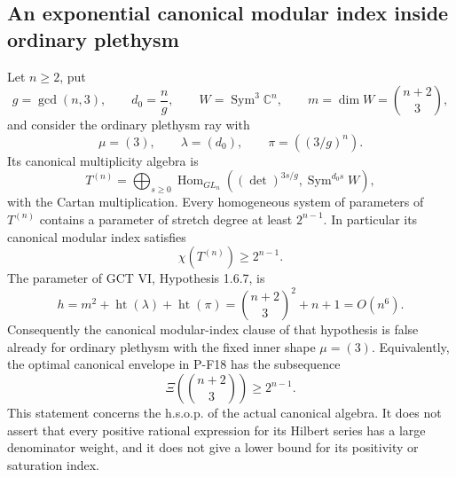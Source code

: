 \subsection{An exponential canonical modular index inside ordinary plethysm}

\begin{proposition}
\label{prop:cubiccanonicalcounterexample}
Let $n\ge2$, put
\[
 g=\gcd(n,3),\qquad d_0=\frac ng,\qquad
 W=\operatorname{Sym}^3\mathbb C^n,\qquad
 m=\dim W=\binom{n+2}{3},
\]
and consider the ordinary plethysm ray with
\[
 \mu=(3),\qquad \lambda=(d_0),\qquad
 \pi=((3/g)^n).
 \tag{P-F19a}
\]
Its canonical multiplicity algebra is
\[
 T^{(n)}=\bigoplus_{s\ge0}
  \operatorname{Hom}_{GL_n}
  \left((\det)^{3s/g},\operatorname{Sym}^{d_0s}W\right),
 \tag{P-F19b}
\]
with the Cartan multiplication. Every homogeneous system of parameters
of $T^{(n)}$ contains a parameter of stretch degree at least
$2^{n-1}$. In particular its canonical modular index satisfies
\[
 \chi(T^{(n)})\ge2^{n-1}.
 \tag{P-F19c}
\]
The parameter of GCT VI, Hypothesis 1.6.7, is
\[
 h=m^2+\operatorname{ht}(\lambda)+\operatorname{ht}(\pi)
   =\binom{n+2}{3}^{\!2}+n+1=O(n^6).
 \tag{P-F19d}
\]
Consequently the canonical modular-index clause of that hypothesis
is false already for ordinary plethysm with the fixed inner shape
$\mu=(3)$. Equivalently, the optimal canonical envelope in P-F18
has the subsequence
\[
 \Xi\!\left(\binom{n+2}{3}\right)\ge2^{n-1}.
 \tag{P-F19e}
\]
This statement concerns the h.s.o.p. of the actual canonical algebra.
It does not assert that every positive rational expression for its
Hilbert series has a large denominator weight, and it does not give
a lower bound for its positivity or saturation index.
\end{proposition}

